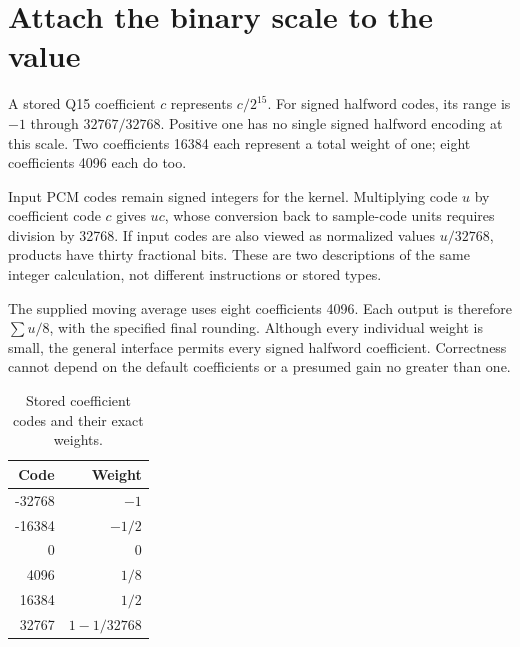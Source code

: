 \section{Attach the binary scale to the value}
A stored Q15 coefficient \(c\) represents \(c/2^{15}\). For signed halfword codes,
its range is \(-1\) through \(32767/32768\). Positive one has no single signed
halfword encoding at this scale. Two coefficients 16384 each represent a total
weight of one; eight coefficients 4096 each do too.

Input PCM codes remain signed integers for the kernel. Multiplying code \(u\) by
coefficient code \(c\) gives \(uc\), whose conversion back to sample-code units
requires division by 32768. If input codes are also viewed as normalized values
\(u/32768\), products have thirty fractional bits. These are two descriptions of
the same integer calculation, not different instructions or stored types.

The supplied moving average uses eight coefficients 4096. Each output is therefore
\(\sum u/8\), with the specified final rounding. Although every individual weight
is small, the general interface permits every signed halfword coefficient. Correctness
cannot depend on the default coefficients or a presumed gain no greater than one.

\begin{table}[htbp]
\centering
\caption{Stored coefficient codes and their exact weights.}
\begin{tabular}{rr}
\toprule
Code & Weight\\
\midrule
-32768 & \(-1\)\\
-16384 & \(-1/2\)\\
0 & \(0\)\\
4096 & \(1/8\)\\
16384 & \(1/2\)\\
32767 & \(1-1/32768\)\\
\bottomrule
\end{tabular}
\end{table}
